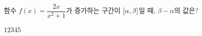 함수 $f(x)=\dfrac{2x}{x^2+1}$가 증가하는 구간이 $[\alpha{,}\mkern3mu\mathopen{}\beta]$일 때, $\beta-\alpha$의 값은?
\begin{choices32}{$1$}{$2$}{$3$}{$4$}{$5$}\end{choices32}
